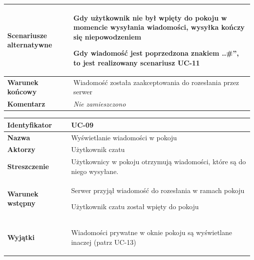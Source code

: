 {\begin{tabular}{ | l | l | }
	\hline
		\parbox[t]{4cm}{\textbf{Scenariusze alternatywne}} & \parbox[t]
		{11cm}{
			\begin{enumreq}
				\item Gdy użytkownik nie był wpięty do pokoju w momencie
				wysyłania wiadomości, wysyłka kończy się niepowodzeniem
				\item Gdy wiadomość jest poprzedzona znakiem ..\#'', to
				jest realizowany scenariusz UC-11
			\end{enumreq}
		}
		\\
		
	\hline
		\parbox[t]{4cm}{\textbf{Warunek końcowy}} & \parbox[t]{11cm}{
			Wiadomość została zaakceptowania do rozesłania przez serwer
		}
		\\
		
	\hline
		\parbox[t]{4cm}{\textbf{Komentarz}} & \parbox[t]{11cm}{
			\textit{Nie zamieszczono}
		}
		\\

	\hline
\end{tabular}

\vspace{2em}

\begin{tabular}{ | l | l | }
	\hline
		\textbf{Identyfikator} & 
		UC-09
		\\
		
	\hline
		\textbf{Nazwa} & 
		Wyświetlanie wiadomości w pokoju
		\\
		
	\hline
		\textbf{Aktorzy} & \parbox[t]{11cm}{
			Użytkownik czatu
		}\\
		 
	\hline
		\parbox[t]{4cm}{\textbf{Streszczenie}} & \parbox[t]{11cm}{
			Użytkownicy w pokoju otrzymują wiadomości, które są do niego
			wysyłane.
			
		}\\
		
	\hline
		\parbox[t]{4cm}{\textbf{Warunek wstępny}} & \parbox[t]{11cm}{
			\begin{enumreq}
				\item Serwer przyjął wiadomość do rozesłania w ramach pokoju
				\item Użytkownik czatu został wpięty do pokoju
			\end{enumreq}
				
		}
		\\
		
	\hline
		\parbox[t]{4cm}{\textbf{Wyjątki}} & \parbox[t]{11cm}{
			\begin{enumreq}
				\item Wiadomości prywatne w oknie pokoju są wyświetlane
				inaczej (patrz UC-13)
			\end{enumreq}
			
}
\end{tabular}}
